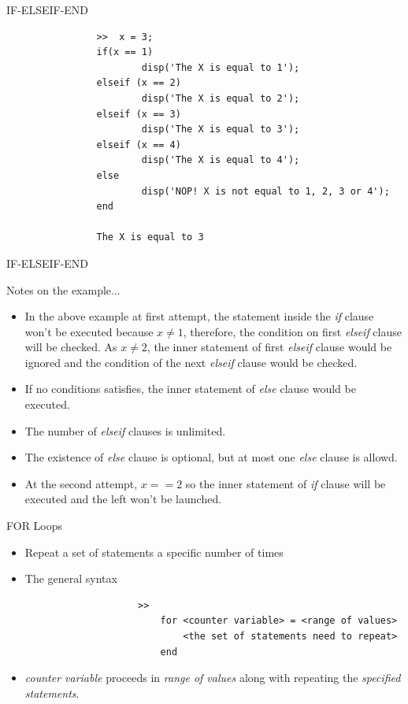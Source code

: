 \documentclass{beamer}
\begin{document}
\begin{frame}[fragile]{IF-ELSEIF-END}
	\begin{block}{}
				\java
				\begin{lstlisting}
				>>	x = 3;
				if(x == 1)
						disp('The X is equal to 1');
				elseif (x == 2)
						disp('The X is equal to 2');
				elseif (x == 3)
						disp('The X is equal to 3');
				elseif (x == 4)
						disp('The X is equal to 4');
				else
						disp('NOP! X is not equal to 1, 2, 3 or 4');
				end
				
				The X is equal to 3
				\end{lstlisting}
	\end{block}

\end{frame}

\begin{frame}{IF-ELSEIF-END}
	\begin{block}{Notes on the example...}
		\begin{itemize}
			\item In the above example at first attempt, the statement inside the \textit{if} clause won't be executed because $x \neq 1$, therefore, the condition on first \textit{elseif} clause will be checked. As $x \neq 2$, the inner statement of first \textit{elseif} clause would be ignored and the condition of the next \textit{elseif} clause would be checked. 
			\item If no conditions satisfies, the inner statement of \textit{else} clause would be executed.
			\item The number of \textit{elseif} clauses is unlimited.
			\item The existence of \textit{else} clause is optional, but at most one \textit{else} clause is allowd.
			\item At the second attempt, $x == 2$ so the inner statement of \textit{if} clause will be executed and the left won't be launched.
		\end{itemize}
	\end{block}
\end{frame}	
	
	
		
\begin{frame}[fragile]{FOR Loops}
	\begin{block}{}
		\begin{itemize}
			\item Repeat a set of statements a specific number of times
			\item The general syntax
			\java
				\begin{lstlisting}
					>> 
						for <counter variable> = <range of values>
							<the set of statements need to repeat>
						end
				\end{lstlisting}
			\item \textit{counter variable} proceeds in \textit{range of values} along with repeating the \textit{specified statements}.
		\end{itemize}	
	\end{block}
\end{frame}
\end{document}
